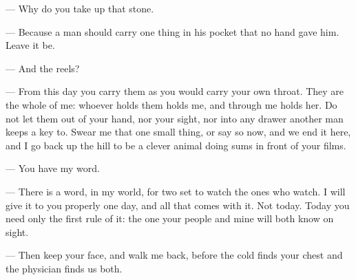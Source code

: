 \begin{room}
--- Why do you take up that stone.

--- Because a man should carry one thing in his pocket that no hand gave him. Leave it be.

--- And the reels?

--- From this day you carry them as you would carry your own throat. They are the whole of me: whoever holds them holds me, and through me holds her. Do not let them out of your hand, nor your sight, nor into any drawer another man keeps a key to. Swear me that one small thing, or say so now, and we end it here, and I go back up the hill to be a clever animal doing sums in front of your films.

--- You have my word.

--- There is a word, in my world, for two set to watch the ones who watch. I will give it to you properly one day, and all that comes with it. Not today. Today you need only the first rule of it: the one your people and mine will both know on sight.

--- Then keep your face, and walk me back, before the cold finds your chest and the physician finds us both.

\end{room}

\ornament
